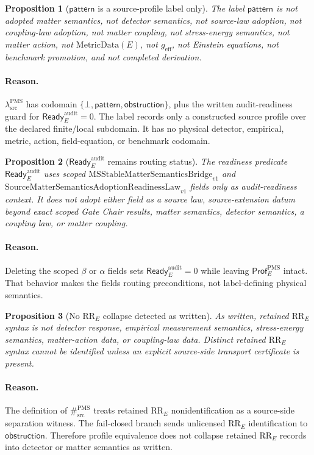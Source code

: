 \documentclass[11pt]{article}
\newcommand{\MSBridge}{\mathrm{MSStableMatterSemanticsBridge}_{v1}}
\newcommand{\SMSAR}{\mathrm{SourceMatterSemanticsAdoptionReadinessLaw}_{v1}}
\newcommand{\Prof}{\mathsf{Prof}^{\mathrm{PMS}}_E}
\newcommand{\Ready}{\mathsf{Ready}^{\mathrm{audit}}_E}
\newcommand{\lambdaProf}{\lambda^{\mathrm{PMS}}_{\mathrm{src}}}
\newcommand{\SepProf}{\#^{\mathrm{PMS}}_{\mathrm{src}}}
\newcommand{\Pattern}{\mathsf{pattern}}
\newcommand{\Obstruction}{\mathsf{obstruction}}
\newcommand{\Bottom}{\bot}
\newcommand{\RRE}{\mathrm{RR}_E}
\newcommand{\MetricData}{\mathrm{MetricData}}
\newcommand{\geff}{g_{\mathrm{eff}}}
\newtheorem{proposition}{Proposition}
\begin{document}
\begin{proposition}[\(\Pattern\) is a source-profile label only]
The label \(\Pattern\) is not adopted matter semantics, not detector
semantics, not source-law adoption, not coupling-law adoption, not matter
coupling, not stress-energy semantics, not matter action, not
\(\MetricData(E)\), not \(\geff\), not Einstein equations, not benchmark
promotion, and not completed derivation.
\end{proposition}

\paragraph{Reason.}
\(\lambdaProf\) has codomain
\(\{\Bottom,\Pattern,\Obstruction\}\), plus the written audit-readiness guard
for \(\Ready=0\). The label records only a constructed source profile over
the declared finite/local subdomain. It has no physical detector, empirical,
metric, action, field-equation, or benchmark codomain.

\begin{proposition}[\(\Ready\) remains routing status]
The readiness predicate \(\Ready\) uses scoped \(\MSBridge\) and \(\SMSAR\)
fields only as audit-readiness context. It does not adopt either field as a
source law, source-extension datum beyond exact scoped Gate Chair results,
matter semantics, detector semantics, a coupling law, or matter coupling.
\end{proposition}

\paragraph{Reason.}
Deleting the scoped \(\beta\) or \(\alpha\) fields sets \(\Ready=0\) while
leaving \(\Prof\) intact. That behavior makes the fields routing
preconditions, not label-defining physical semantics.

\begin{proposition}[No \(\RRE\) collapse detected as written]
As written, retained \(\RRE\) syntax is not detector response, empirical
measurement semantics, stress-energy semantics, matter-action data, or
coupling-law data. Distinct retained \(\RRE\) syntax cannot be identified
unless an explicit source-side transport certificate is present.
\end{proposition}

\paragraph{Reason.}
The definition of \(\SepProf\) treats retained \(\RRE\) nonidentification as
a source-side separation witness. The fail-closed branch sends unlicensed
\(\RRE\) identification to \(\Obstruction\). Therefore profile equivalence
does not collapse retained \(\RRE\) records into detector or matter semantics
as written.
\end{document}

